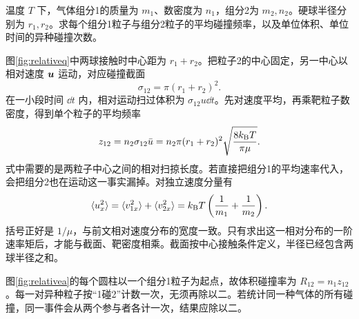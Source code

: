 \begin{example}[不同分子之间的碰撞速率]\label{ex:relative}
温度 $T$ 下，气体组分1的质量为 $m_1$、数密度为 $n_1$，组分2为 $m_2,n_2$。硬球半径分别为 $r_1,r_2$。求每个组分1粒子与组分2粒子的平均碰撞频率，以及单位体积、单位时间的异种碰撞次数。
\end{example}
\begin{solution}
图\ref{fig:relativeq}中两球接触时中心距为 $r_1+r_2$。把粒子2的中心固定，另一中心以相对速度 $\bm{u}$ 运动，对应碰撞截面
\[
 \sigma_{12}=\pi(r_1+r_2)^2.
\]
在一小段时间 $\dd t$ 内，相对运动扫过体积为 $\sigma_{12}u\dd t$。先对速度平均，再乘靶粒子数密度，得到单个粒子的平均频率
\[
 z_{12}=n_2\sigma_{12}\bar u
 =n_2\pi(r_1+r_2)^2\sqrt{\frac{8k_{\mathrm B} T}{\pi\mu}}.
\]
式中需要的是两粒子中心之间的相对扫掠长度。若直接把组分1的平均速率代入，会把组分2也在运动这一事实漏掉。对独立速度分量有
\[
 \langle u_x^2\rangle=\langle v_{1x}^2\rangle+
 \langle v_{2x}^2\rangle
 =k_{\mathrm B} T\left(\frac1{m_1}+\frac1{m_2}\right).
\]
括号正好是 $1/\mu$，与前文相对速度分布的宽度一致。只有求出这一相对分布的一阶速率矩后，才能与截面、靶密度相乘。截面按中心接触条件定义，半径已经包含两球半径之和。

图\ref{fig:relativea}的每个圆柱以一个组分1粒子为起点，故体积碰撞率为 $R_{12}=n_1z_{12}$。每一对异种粒子按“1碰2”计数一次，无须再除以二。若统计同一种气体的所有碰撞，同一事件会从两个参与者各计一次，结果应除以二。
\end{solution}

